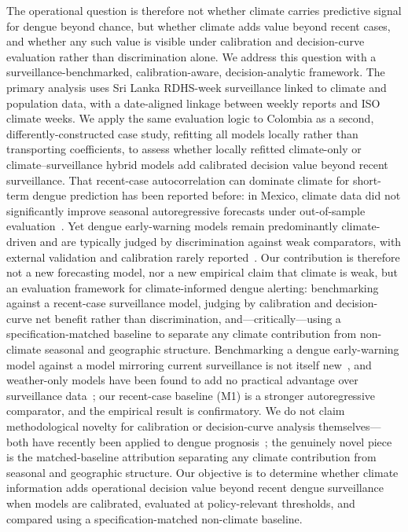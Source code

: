 \documentclass[11pt,a4paper]{article}
\begin{document}
The operational question is therefore not whether climate carries predictive signal for dengue beyond chance, but whether climate adds value beyond recent cases, and whether any such value is visible under calibration and decision-curve evaluation rather than discrimination alone. We address this question with a surveillance-benchmarked, calibration-aware, decision-analytic framework. The primary analysis uses Sri Lanka RDHS-week surveillance linked to climate and population data, with a date-aligned linkage between weekly reports and ISO climate weeks. We apply the same evaluation logic to Colombia as a second, differently-constructed case study, refitting all models locally rather than transporting coefficients, to assess whether locally refitted climate-only or climate--surveillance hybrid models add calibrated decision value beyond recent surveillance. That recent-case autocorrelation can dominate climate for short-term dengue prediction has been reported before: in Mexico, climate data did not significantly improve seasonal autoregressive forecasts under out-of-sample evaluation~\cite{Johansson2016}. Yet dengue early-warning models remain predominantly climate-driven and are typically judged by discrimination against weak comparators, with external validation and calibration rarely reported~\cite{Leung2022,HussainAlkhateeb2021}. Our contribution is therefore not a new forecasting model, nor a new empirical claim that climate is weak, but an evaluation framework for climate-informed dengue alerting: benchmarking against a recent-case surveillance model, judging by calibration and decision-curve net benefit rather than discrimination, and---critically---using a specification-matched baseline to separate any climate contribution from non-climate seasonal and geographic structure. Benchmarking a dengue early-warning model against a model mirroring current surveillance is not itself new~\cite{Lowe2013}, and weather-only models have been found to add no practical advantage over surveillance data~\cite{Benedum2020}; our recent-case baseline (M1) is a stronger autoregressive comparator, and the empirical result is confirmatory. We do not claim methodological novelty for calibration or decision-curve analysis themselves---both have recently been applied to dengue prognosis~\cite{Sangkaew2026}; the genuinely novel piece is the matched-baseline attribution separating any climate contribution from seasonal and geographic structure. Our objective is to determine whether climate information adds operational decision value beyond recent dengue surveillance when models are calibrated, evaluated at policy-relevant thresholds, and compared using a specification-matched non-climate baseline.
\end{document}
